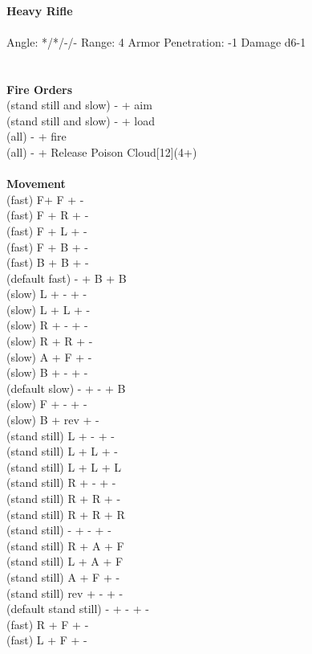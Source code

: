\ \\
{\bf Heavy Rifle } \\
\ \\
Angle: */*/-/- Range: 4 Armor Penetration: -1 Damage d6-1 \\
\indent  \\





\ \\ {\bf Fire Orders } \\
(stand still and slow) - + aim \\
(stand still and slow) - + load \\
(all) - + fire \\
(all) - + Release Poison Cloud[12](4+) \\
\ \\ {\bf Movement } \\
(fast) F+ F + - \\
(fast) F + R + - \\
(fast) F + L + - \\
(fast) F + B + - \\
(fast) B + B + - \\
(default fast) - + B + B \\
(slow) L + - + - \\
(slow) L + L + - \\
(slow) R + - + - \\
(slow) R + R + - \\
(slow) A + F + - \\
(slow) B + - + - \\
(default slow) - + - + B \\
(slow) F + - + - \\
(slow) B + rev + - \\
(stand still) L + - + - \\
(stand still) L + L + - \\
(stand still) L + L + L \\
(stand still) R + - + - \\
(stand still) R + R + - \\
(stand still) R + R + R \\
(stand still) - + - + - \\
(stand still) R + A + F \\
(stand still) L + A + F \\
(stand still) A + F + - \\
(stand still) rev + - + - \\
(default stand still) - + - + - \\
(fast) R + F + - \\
(fast) L + F + - \\



